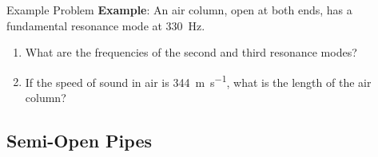 \documentclass[12pt,compress,aspectratio=169]{beamer}
\begin{document}
\begin{frame}{Example Problem}
  \textbf{Example}: An air column, open at both ends, has a fundamental
  resonance mode at \SI{330}\hertz.
  \begin{enumerate}
  \item What are the frequencies of the second and third resonance modes?
  \item If the speed of sound in air is \SI{344}{\metre\per\second}, what is the
    length of the air column?
  \end{enumerate}
\end{frame}



\subsection{Semi-Open Pipes}
\end{document}

